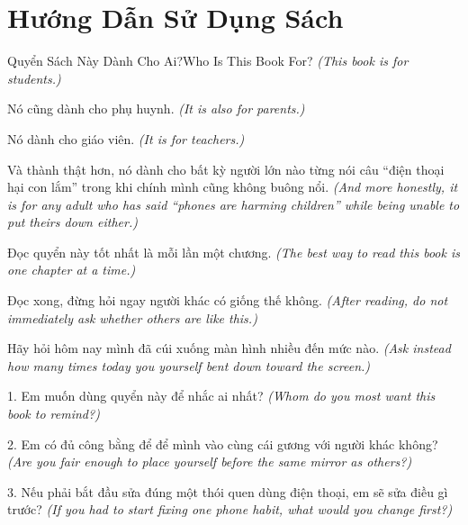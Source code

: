 \chapter*{Hướng Dẫn Sử Dụng Sách}

\begin{truyen}{Quyển Sách Này Dành Cho Ai?}{Who Is This Book For?}
\textit{(This book is for students.)}

Nó cũng dành cho phụ huynh.
\textit{(It is also for parents.)}

Nó dành cho giáo viên.
\textit{(It is for teachers.)}

Và thành thật hơn, nó dành cho bất kỳ người lớn nào từng nói câu ``điện thoại hại con lắm'' trong khi chính mình cũng không buông nổi.
\textit{(And more honestly, it is for any adult who has said ``phones are harming children'' while being unable to put theirs down either.)}
\end{truyen}

\begin{baihoc}
Đọc quyển này tốt nhất là mỗi lần một chương.
\textit{(The best way to read this book is one chapter at a time.)}

Đọc xong, đừng hỏi ngay người khác có giống thế không.
\textit{(After reading, do not immediately ask whether others are like this.)}

Hãy hỏi hôm nay mình đã cúi xuống màn hình nhiều đến mức nào.
\textit{(Ask instead how many times today you yourself bent down toward the screen.)}
\end{baihoc}

\begin{tuhocnhanh}
1. Em muốn dùng quyển này để nhắc ai nhất? \textit{(Whom do you most want this book to remind?)}

2. Em có đủ công bằng để để mình vào cùng cái gương với người khác không? \textit{(Are you fair enough to place yourself before the same mirror as others?)}

3. Nếu phải bắt đầu sửa đúng một thói quen dùng điện thoại, em sẽ sửa điều gì trước? \textit{(If you had to start fixing one phone habit, what would you change first?)}
\end{tuhocnhanh}

\ngancach
